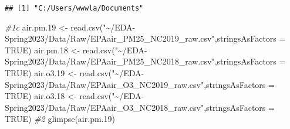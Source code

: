 \documentclass[
]{article}
\newenvironment{Shaded}{\begin{snugshade}}{\end{snugshade}}
\newcommand{\AttributeTok}[1]{\textcolor[rgb]{0.77,0.63,0.00}{#1}}
\newcommand{\CommentTok}[1]{\textcolor[rgb]{0.56,0.35,0.01}{\textit{#1}}}
\newcommand{\ConstantTok}[1]{\textcolor[rgb]{0.00,0.00,0.00}{#1}}
\newcommand{\FloatTok}[1]{\textcolor[rgb]{0.00,0.00,0.81}{#1}}
\newcommand{\FunctionTok}[1]{\textcolor[rgb]{0.00,0.00,0.00}{#1}}
\newcommand{\NormalTok}[1]{#1}
\newcommand{\OtherTok}[1]{\textcolor[rgb]{0.56,0.35,0.01}{#1}}
\newcommand{\StringTok}[1]{\textcolor[rgb]{0.31,0.60,0.02}{#1}}
\begin{document}
\begin{verbatim}
## [1] "C:/Users/wwwla/Documents"
\end{verbatim}

\begin{Shaded}
\begin{Highlighting}[]
\CommentTok{\#1c }
\NormalTok{air.pm}\FloatTok{.19} \OtherTok{\textless{}{-}} \FunctionTok{read.csv}\NormalTok{(}\StringTok{"\textasciitilde{}/EDA{-}Spring2023/Data/Raw/EPAair\_PM25\_NC2019\_raw.csv"}\NormalTok{,}\AttributeTok{stringsAsFactors =} \ConstantTok{TRUE}\NormalTok{)}
\NormalTok{air.pm}\FloatTok{.18} \OtherTok{\textless{}{-}} \FunctionTok{read.csv}\NormalTok{(}\StringTok{"\textasciitilde{}/EDA{-}Spring2023/Data/Raw/EPAair\_PM25\_NC2018\_raw.csv"}\NormalTok{,}\AttributeTok{stringsAsFactors =} \ConstantTok{TRUE}\NormalTok{)}
\NormalTok{air.o3}\FloatTok{.19} \OtherTok{\textless{}{-}} \FunctionTok{read.csv}\NormalTok{(}\StringTok{"\textasciitilde{}/EDA{-}Spring2023/Data/Raw/EPAair\_O3\_NC2019\_raw.csv"}\NormalTok{,}\AttributeTok{stringsAsFactors =} \ConstantTok{TRUE}\NormalTok{)}
\NormalTok{air.o3}\FloatTok{.18} \OtherTok{\textless{}{-}} \FunctionTok{read.csv}\NormalTok{(}\StringTok{"\textasciitilde{}/EDA{-}Spring2023/Data/Raw/EPAair\_O3\_NC2018\_raw.csv"}\NormalTok{,}\AttributeTok{stringsAsFactors =} \ConstantTok{TRUE}\NormalTok{)}
\CommentTok{\#2 }
\FunctionTok{glimpse}\NormalTok{(air.pm}\FloatTok{.19}\NormalTok{)}
\end{Highlighting}
\end{Shaded}
\end{document}
